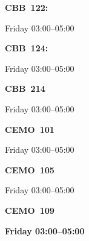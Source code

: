 \documentclass[11pt,oneside,letter]{article}
\begin{document}
\newpage
\begin{center}
{\LARGE {\bf CBB~122:}}
\end{center}

\begin{center}
{\large Friday 03:00--05:00}
\end{center}






\newpage
\begin{center}
{\LARGE {\bf CBB~124:}}
\end{center}

\begin{center}
{\large Friday 03:00--05:00}
\end{center}

\newpage




\begin{center}
{\LARGE {\bf CBB~214}}
\end{center}

\begin{center}
{\large Friday 03:00--05:00}
\end{center}


\newpage




\begin{center}
{\LARGE {\bf CEMO~101}}
\end{center}

\begin{center}
{\large Friday 03:00--05:00}
\end{center}


\newpage



\begin{center}
{\LARGE {\bf CEMO~105}}
\end{center}

\begin{center}
{\large Friday 03:00--05:00}
\end{center}

\newpage



\begin{center}
{\LARGE {\bf CEMO~109}}
\end{center}

\begin{center}
{\large \bf Friday 03:00--05:00}
\end{center}
\end{document}
